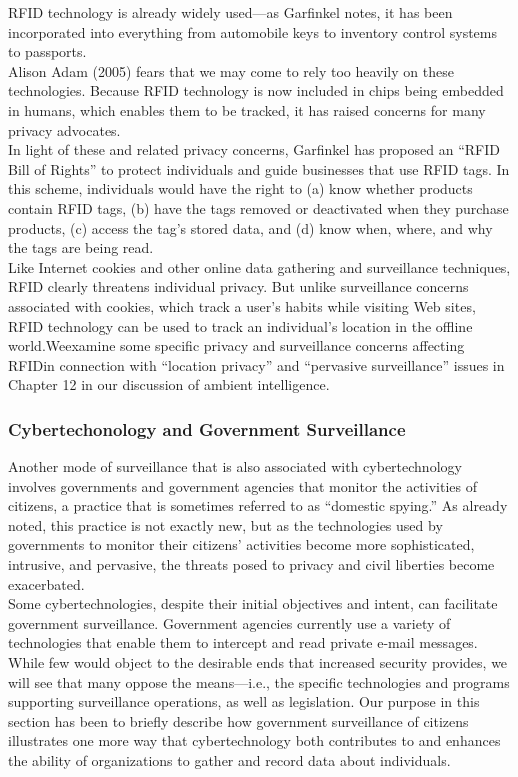 \documentclass[12pt]{article}
\theoremstyle{definition}
\begin{document}
RFID technology is already widely used—as Garfinkel notes, it has been incorporated
into everything from automobile keys to inventory control systems to passports.\\
Alison Adam
(2005) fears that we may come to rely too heavily on these technologies. Because RFID technology is now included in chips being embedded in humans,
which enables them to be tracked, it has raised concerns for many privacy advocates.\\
In light of these and related privacy concerns, Garfinkel has proposed an “RFID Bill
of Rights” to protect individuals and guide businesses that use RFID tags. In this scheme,
individuals would have the right to (a) know whether products contain RFID tags, (b)
have the tags removed or deactivated when they purchase products, (c) access the tag’s
stored data, and (d) know when, where, and why the tags are being read.\\
Like Internet cookies and other online data gathering and surveillance techniques,
RFID clearly threatens individual privacy. But unlike surveillance concerns associated with
cookies, which track a user’s habits while visiting Web sites, RFID technology can be used
to track an individual’s location in the offline world.Weexamine some specific privacy and
surveillance concerns affecting RFIDin connection with “location privacy” and “pervasive
surveillance” issues in Chapter 12 in our discussion of ambient intelligence.
\subsubsection{Cybertechonology and Government Surveillance}
Another mode of surveillance that is also
associated with cybertechnology involves governments and government agencies that
monitor the activities of citizens, a practice that is sometimes referred to as “domestic
spying.” As already noted, this practice is not exactly new, but as the technologies used by
governments to monitor their citizens’ activities become more sophisticated, intrusive,
and pervasive, the threats posed to privacy and civil liberties become exacerbated.\\
Some cybertechnologies, despite their initial objectives and intent, can facilitate
government surveillance. Government agencies currently use a variety of technologies that enable them to
intercept and read private e-mail messages.\\
While few would object to the desirable ends that increased security provides, we will
see that many oppose the means—i.e., the specific technologies and programs supporting
surveillance operations, as well as legislation. Our purpose in this section has been to briefly
describe how government surveillance of citizens illustrates one more way that cybertechnology
both contributes to and enhances the ability of organizations to gather and
record data about individuals.\\
\end{document}
